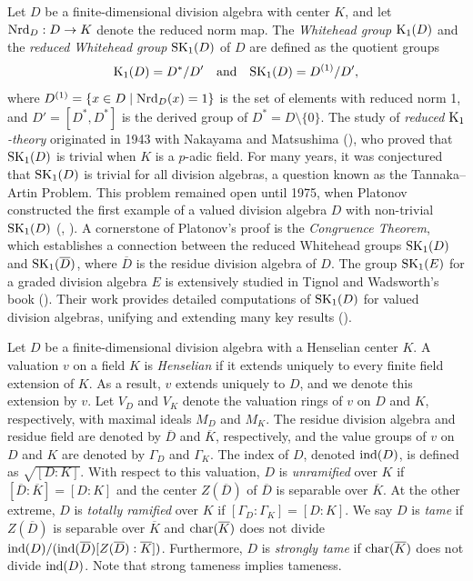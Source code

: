 \documentclass{amsart}
\theoremstyle{definition}
\numberwithin{equation}{section} %
\begin{document}
Let $D$ be a finite-dimensional division algebra with center $K$, and let ${\rm Nrd}_D: D \to K$ denote the reduced norm map. The \emph{Whitehead group} ${\rm K}_1(D)$ and the \emph{reduced Whitehead group} ${\rm SK}_1(D)$ of $D$ are defined as the quotient groups
\[
{\rm K}_1(D) = D^*/D' \quad \text{and} \quad {\rm SK}_1(D) = D^{(1)}/D',
\]
where $D^{(1)} = \{ x \in D \mid {\rm Nrd}_D(x) = 1 \}$ is the set of elements with reduced norm 1, and $D' = [D^*, D^*]$ is the derived group of $D^* = D \setminus \{0\}$. The study of \emph{reduced ${\rm K}_1$-theory} originated in 1943 with Nakayama and Matsushima (\cite{nakayama-matsushima-43}), who proved that ${\rm SK}_1(D)$ is trivial when $K$ is a $p$-adic field. For many years, it was conjectured that ${\rm SK}_1(D)$ is trivial for all division algebras, a question known as the Tannaka--Artin Problem. This problem remained open until 1975, when Platonov constructed the first example of a valued division algebra $D$ with non-trivial ${\rm SK}_1(D)$ (\cite{platonov-75}, \cite{platonov-75-2}). A cornerstone of Platonov's proof is the \emph{Congruence Theorem}, which establishes a connection between the reduced Whitehead groups ${\rm SK}_1(D)$ and ${\rm SK}_1(\overline{D})$, where $\overline{D}$ is the residue division algebra of $D$. The group ${\rm SK}_1(E)$ for a graded division algebra $E$ is extensively studied in Tignol and Wadsworth's book (\cite{tignol-wadsworth-10}). Their work provides detailed computations of ${\rm SK}_1(D)$ for valued division algebras, unifying and extending many key results (\cite[Chapter 11]{tignol-wadsworth-10}).

Let $D$ be a finite-dimensional division algebra with a Henselian center $K$. A valuation $v$ on a field $K$ is \emph{Henselian} if it extends uniquely to every finite field extension of $K$. As a result, $v$ extends uniquely to $D$, and we denote this extension by $v$. Let $V_D$ and $V_K$ denote the valuation rings of $v$ on $D$ and $K$, respectively, with maximal ideals $M_D$ and $M_K$. The residue division algebra and residue field are denoted by $\overline{D}$ and $\overline{K}$, respectively, and the value groups of $v$ on $D$ and $K$ are denoted by $\Gamma_D$ and $\Gamma_K$. The index of $D$, denoted ${\rm ind}(D)$, is defined as $\sqrt{[D:K]}$. With respect to this valuation, $D$ is \emph{unramified} over $K$ if $[\overline{D}:\overline{K}] = [D:K]$ and the center $Z(\overline{D})$ of $\overline{D}$ is separable over $\overline{K}$. At the other extreme, $D$ is \emph{totally ramified} over $K$ if $[\Gamma_D:\Gamma_K] = [D:K]$. We say $D$ is \emph{tame} if $Z(\overline{D})$ is separable over $\overline{K}$ and ${\rm char}(\overline{K})$ does not divide ${\rm ind}(D)/({\rm ind}(\overline{D})[Z(\overline{D}):\overline{K}])$. Furthermore, $D$ is \emph{strongly tame} if ${\rm char}(\overline{K})$ does not divide ${\rm ind}(D)$. Note that strong tameness implies tameness.
\end{document}
